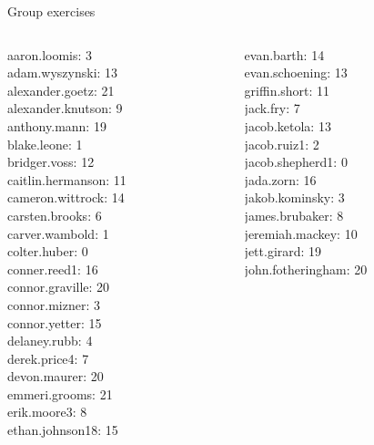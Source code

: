 \documentclass[10pt]{beamer}
\begin{document}
\begin{frame}[standout]
Group exercises
\end{frame}

\begin{frame}
\footnotesize 
\vfill 
\begin{columns}
\begin{column}{0.33\textwidth}
aaron.loomis: 3 \\ 
adam.wyszynski: 13 \\ 
alexander.goetz: 21 \\ 
alexander.knutson: 9 \\ 
anthony.mann: 19 \\ 
blake.leone: 1 \\ 
bridger.voss: 12 \\ 
caitlin.hermanson: 11 \\ 
cameron.wittrock: 14 \\ 
carsten.brooks: 6 \\ 
carver.wambold: 1 \\ 
colter.huber: 0 \\ 
conner.reed1: 16 \\ 
connor.graville: 20 \\ 
connor.mizner: 3 \\ 
connor.yetter: 15 \\ 
delaney.rubb: 4 \\ 
derek.price4: 7 \\ 
devon.maurer: 20 \\ 
emmeri.grooms: 21 \\ 
erik.moore3: 8 \\ 
ethan.johnson18: 15 \\\end{column}
\begin{column}{0.33\textwidth}
evan.barth: 14 \\ 
evan.schoening: 13 \\ 
griffin.short: 11 \\ 
jack.fry: 7 \\ 
jacob.ketola: 13 \\ 
jacob.ruiz1: 2 \\ 
jacob.shepherd1: 0 \\ 
jada.zorn: 16 \\ 
jakob.kominsky: 3 \\ 
james.brubaker: 8 \\ 
jeremiah.mackey: 10 \\ 
jett.girard: 19 \\ 
john.fotheringham: 20 \\ 

\end{column}
\end{columns}
\end{frame}
\end{document}

